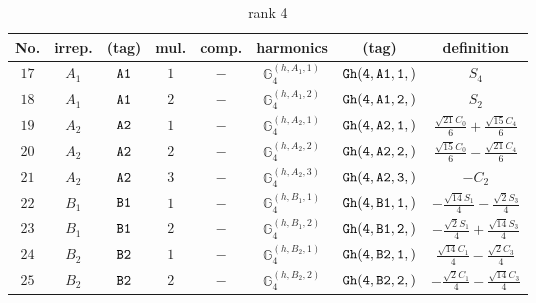 \documentclass[fleqn,8pt]{jsarticle}
\begin{document}
\begin{table}[ht!]
\begin{center}
\caption{rank 4}
\renewcommand{\arraystretch}{1.3}
\begin{tabular}{cccccccc} \hline \hline
No. & irrep. & (tag) & mul. & comp. & harmonics & (tag) & definition \\ \hline
$ 17 $ & $ A_{1} $ & $ {\tt A1} $ & $ 1 $ & $ - $ & $ \mathbb{G}_{4}^{(h,A_{1},1)} $ & $ {\tt Gh(4,A1,1,)} $ & $ S_{4} $ \\
$ 18 $ & $ A_{1} $ & $ {\tt A1} $ & $ 2 $ & $ - $ & $ \mathbb{G}_{4}^{(h,A_{1},2)} $ & $ {\tt Gh(4,A1,2,)} $ & $ S_{2} $ \\
$ 19 $ & $ A_{2} $ & $ {\tt A2} $ & $ 1 $ & $ - $ & $ \mathbb{G}_{4}^{(h,A_{2},1)} $ & $ {\tt Gh(4,A2,1,)} $ & $ \frac{\sqrt{21} C_{0}}{6} + \frac{\sqrt{15} C_{4}}{6} $ \\
$ 20 $ & $ A_{2} $ & $ {\tt A2} $ & $ 2 $ & $ - $ & $ \mathbb{G}_{4}^{(h,A_{2},2)} $ & $ {\tt Gh(4,A2,2,)} $ & $ \frac{\sqrt{15} C_{0}}{6} - \frac{\sqrt{21} C_{4}}{6} $ \\
$ 21 $ & $ A_{2} $ & $ {\tt A2} $ & $ 3 $ & $ - $ & $ \mathbb{G}_{4}^{(h,A_{2},3)} $ & $ {\tt Gh(4,A2,3,)} $ & $ - C_{2} $ \\
$ 22 $ & $ B_{1} $ & $ {\tt B1} $ & $ 1 $ & $ - $ & $ \mathbb{G}_{4}^{(h,B_{1},1)} $ & $ {\tt Gh(4,B1,1,)} $ & $ - \frac{\sqrt{14} S_{1}}{4} - \frac{\sqrt{2} S_{3}}{4} $ \\
$ 23 $ & $ B_{1} $ & $ {\tt B1} $ & $ 2 $ & $ - $ & $ \mathbb{G}_{4}^{(h,B_{1},2)} $ & $ {\tt Gh(4,B1,2,)} $ & $ - \frac{\sqrt{2} S_{1}}{4} + \frac{\sqrt{14} S_{3}}{4} $ \\
$ 24 $ & $ B_{2} $ & $ {\tt B2} $ & $ 1 $ & $ - $ & $ \mathbb{G}_{4}^{(h,B_{2},1)} $ & $ {\tt Gh(4,B2,1,)} $ & $ \frac{\sqrt{14} C_{1}}{4} - \frac{\sqrt{2} C_{3}}{4} $ \\
$ 25 $ & $ B_{2} $ & $ {\tt B2} $ & $ 2 $ & $ - $ & $ \mathbb{G}_{4}^{(h,B_{2},2)} $ & $ {\tt Gh(4,B2,2,)} $ & $ - \frac{\sqrt{2} C_{1}}{4} - \frac{\sqrt{14} C_{3}}{4} $ \\
 \hline \hline
\end{tabular}
\end{center}
\end{table}
\end{document}
